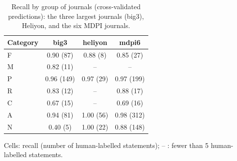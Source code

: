 \begin{table}[htbp]
\centering
\caption{Recall by group of journals (cross-validated predictions): the three largest journals (big3), Heliyon, and the six MDPI journals.}
\label{tab:classifier_by_group}
\small
\begin{tabular}{lccc}
\toprule
Category & big3 & heliyon & mdpi6 \\
\midrule
F & 0.90 (87) & 0.88 (8) & 0.85 (27) \\
M & 0.82 (11) & -- & -- \\
P & 0.96 (149) & 0.97 (29) & 0.97 (199) \\
R & 0.83 (12) & -- & 0.88 (17) \\
C & 0.67 (15) & -- & 0.69 (16) \\
A & 0.94 (81) & 1.00 (56) & 0.98 (312) \\
N & 0.40 (5) & 1.00 (22) & 0.88 (148) \\
\bottomrule
\end{tabular}
\par\smallskip
\footnotesize Cells: recall (number of human-labelled statements); -- : fewer than 5 human-labelled statements.
\end{table}
